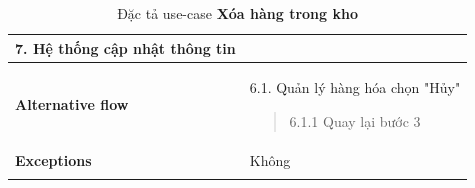 {\begin{longtable}{| p{} | p{} |}
                    7. Hệ thống cập nhật thông tin
                \\
                \hline
                \begin{flushleft}
                    \textbf{Alternative flow}
                \end{flushleft}
                &
                6.1. Quản lý hàng hóa chọn "Hủy"
                    \begin{quote} 
                    
                    6.1.1 Quay lại bước 3
                    \end{quote}
                \\
                \hline
                    \textbf{Exceptions} 
                &
                    Không
                \\
                \hline
                \caption{Đặc tả use-case \textbf{Xóa hàng trong kho}}
            \end{longtable}
        }

